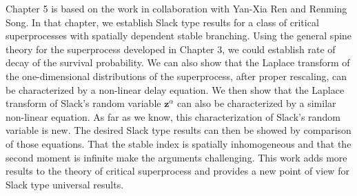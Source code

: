 \documentclass[UTF8]{pkuthss}
\theoremstyle{plain}
\theoremstyle{definition}
\numberwithin{equation}{section}
\begin{document}
    Chapter 5 is based on the work \cite{RenSongSun2018Limit} in collaboration with Yan-Xia Ren and Renming Song. 
    In that chapter, we establish Slack type results for a class of critical superprocesses with spatially dependent stable branching.
    Using the general spine theory for the superprocess developed in Chapter 3, we could establish rate of decay of the survival probability. 
    We can also show that the Laplace transform of the one-dimensional distributions of the superprocess, after proper rescaling, can be characterized by a non-linear delay equation. 
    We then show that the Laplace transform of Slack's random variable $\mathbf z^{\alpha}$ can also be characterized by a similar non-linear equation. 
    As far as we know, this characterization of Slack's random variable is new.
    The desired Slack type results can then be showed by comparison of those equations.
    That the stable index is spatially inhomogeneous and that the second moment is infinite make the arguments challenging.
    This work adds more results to the theory of critical superprocess and provides a new point of view for Slack type universal results.
	
\end{document}
